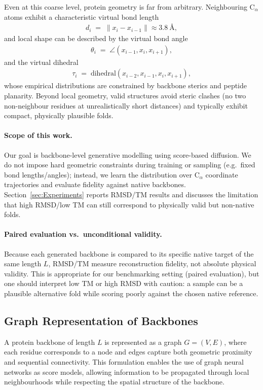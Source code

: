 \documentclass[a4paper,12pt]{article}
\begin{document}
Even at this coarse level, protein geometry is far from arbitrary. Neighbouring C\(_\alpha\) atoms exhibit a characteristic virtual bond length
\begin{align*}
    d_i \;=\; \|x_i - x_{i-1}\| \approx 3.8~\text{\AA},
\end{align*}
and local shape can be described by the virtual bond angle
\begin{align*}
    \theta_i \;=\; \angle(x_{i-1}, x_i, x_{i+1}),
\end{align*}
and the virtual dihedral
\begin{align*}
    \tau_i \;=\; \mathrm{dihedral}(x_{i-2}, x_{i-1}, x_i, x_{i+1}),
\end{align*}
whose empirical distributions are constrained by backbone sterics and peptide planarity. 
Beyond local geometry, valid structures avoid steric clashes (no two non-neighbour residues at unrealistically short distances) and typically exhibit compact, physically plausible folds. 

\paragraph{Scope of this work.}
Our goal is backbone-level generative modelling using score-based diffusion. We do not impose hard geometric constraints during training or sampling (e.g.\ fixed bond lengths/angles); instead, we learn the distribution over C\(_\alpha\) coordinate trajectories and evaluate fidelity against native backbones. Section~\ref{sec:Experiments} reports RMSD/TM results and discusses the limitation that high RMSD/low TM can still correspond to physically valid but non-native folds.

\paragraph{Paired evaluation vs.\ unconditional validity.}
Because each generated backbone is compared to its specific native target of the same length \(L\), RMSD/TM measure reconstruction fidelity, not absolute physical validity. 
This is appropriate for our benchmarking setting (paired evaluation), but one should interpret low TM or high RMSD with caution: a sample can be a plausible alternative fold while scoring poorly against the chosen native reference.

\subsection{Graph Representation of Backbones}\label{subsec:graph-repr}
A protein backbone of length \(L\) is represented as a graph \(G=(V,E)\), where each residue corresponds to a node and edges capture both geometric proximity and sequential connectivity. This formulation enables the use of graph neural networks as score models, allowing information to be propagated through local neighbourhoods while respecting the spatial structure of the backbone. 
\end{document}
